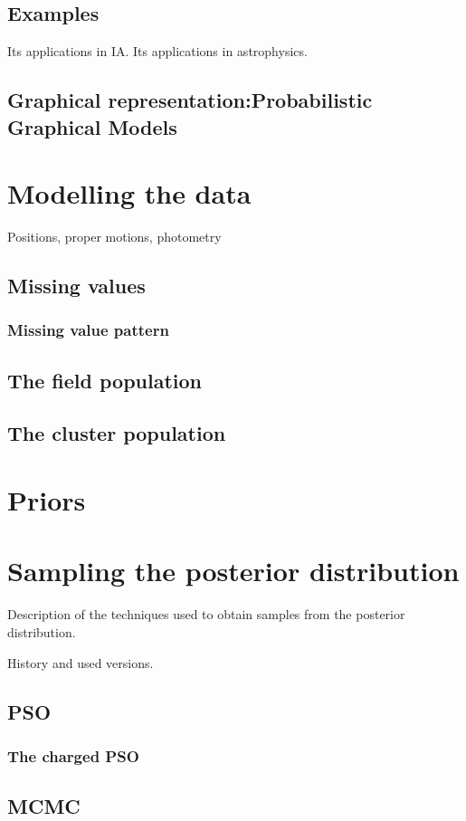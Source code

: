 \subsection{Examples}
Its applications in IA.
Its applications in astrophysics.
\subsection{Graphical representation:Probabilistic Graphical Models}

\section{Modelling the data}
Positions, proper motions, photometry
\subsection{Missing values}
\subsubsection{Missing value pattern}
\subsection{The field population}
\subsection{The cluster population}
\section{Priors}

\section{Sampling the posterior distribution}

Description of the techniques used to obtain samples from the posterior distribution.

History and used versions.

\subsection{PSO}
\subsubsection{The charged PSO}


\subsection{MCMC}
